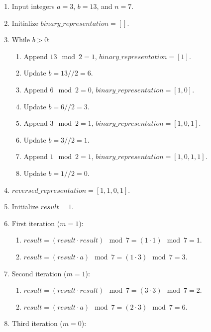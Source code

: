 \documentclass[
  letterpaper,
  DIV=11,
  numbers=noendperiod,
  oneside]{scrartcl}
\providecommand{\tightlist}{%
  \setlength{\itemsep}{0pt}\setlength{\parskip}{0pt}}\usepackage{longtable,booktabs,array}
\begin{document}
\begin{enumerate}
\def\labelenumi{\arabic{enumi}.}
\item
  Input integers \(a = 3\), \(b = 13\), and \(n = 7\).
\item
  Initialize \(binary\_representation = []\).
\item
  While \(b > 0\):

  \begin{enumerate}
  \def\labelenumii{\arabic{enumii}.}
  \tightlist
  \item
    Append \(13 \mod 2 = 1\), \(binary\_representation = [1]\).
  \item
    Update \(b = 13 // 2 = 6\).
  \item
    Append \(6 \mod 2 = 0\), \(binary\_representation = [1, 0]\).
  \item
    Update \(b = 6 // 2 = 3\).
  \item
    Append \(3 \mod 2 = 1\), \(binary\_representation = [1, 0, 1]\).
  \item
    Update \(b = 3 // 2 = 1\).
  \item
    Append \(1 \mod 2 = 1\), \(binary\_representation = [1, 0, 1, 1]\).
  \item
    Update \(b = 1 // 2 = 0\).
  \end{enumerate}
\item
  \(reversed\_representation = [1, 1, 0, 1]\).
\item
  Initialize \(result = 1\).
\item
  First iteration (\(m = 1\)):

  \begin{enumerate}
  \def\labelenumii{\arabic{enumii}.}
  \tightlist
  \item
    \(result = (result \cdot result) \mod 7 = (1 \cdot 1) \mod 7 = 1\).
  \item
    \(result = (result \cdot a) \mod 7 = (1 \cdot 3) \mod 7 = 3\).
  \end{enumerate}
\item
  Second iteration (\(m = 1\)):

  \begin{enumerate}
  \def\labelenumii{\arabic{enumii}.}
  \tightlist
  \item
    \(result = (result \cdot result) \mod 7 = (3 \cdot 3) \mod 7 = 2\).
  \item
    \(result = (result \cdot a) \mod 7 = (2 \cdot 3) \mod 7 = 6\).
  \end{enumerate}
\item
  Third iteration (\(m = 0\)):


\end{enumerate}
\end{document}
